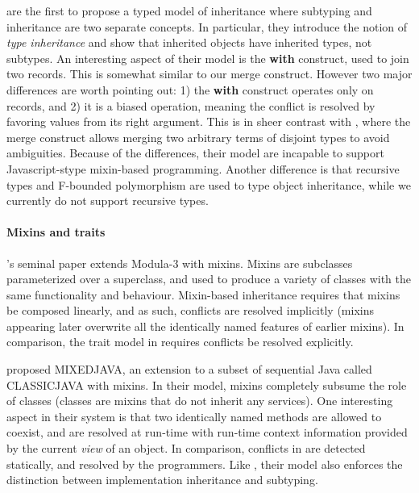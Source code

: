 \citet{cook1989inheritance} are the first to propose a typed model of
inheritance where subtyping and inheritance are two separate concepts. In
particular, they introduce the notion of \textit{type inheritance} and show that
inherited objects have inherited types, not subtypes. An interesting aspect of
their model is the \textbf{with} construct, used to join two records. This is
somewhat similar to our merge construct. However two major differences are worth
pointing out: 1) the \textbf{with} construct operates only on records, and 2) it
is a biased operation, meaning the conflict is resolved by favoring values from
its right argument. This is in sheer contrast with \name, where the merge
construct allows merging two arbitrary terms of disjoint types to avoid
ambiguities. Because of the differences, their model are incapable to support
Javascript-stype mixin-based programming. Another difference is that recursive
types and F-bounded polymorphism are used to type object inheritance, while we
currently do not support recursive types.

\paragraph{Mixins and traits} \citet{bracha1990mixin}'s seminal paper extends
Modula-3 with mixins. Mixins are subclasses parameterized over a superclass, and
used to produce a variety of classes with the same functionality and behaviour.
Mixin-based inheritance requires that mixins be composed linearly, and as such,
conflicts are resolved implicitly (mixins appearing later overwrite all the
identically named features of earlier mixins). In comparison, the trait model in
\name requires conflicts be resolved explicitly.

\citet{flatt1998classes} proposed MIXEDJAVA, an extension to a subset of
sequential Java called CLASSICJAVA with mixins. In their model, mixins
completely subsume the role of classes (classes are mixins that do not inherit
any services). One interesting aspect in their system is that two identically
named methods are allowed to coexist, and are resolved at run-time with run-time
context information provided by the current \textit{view} of an object. In
comparison, conflicts in \name are detected statically, and resolved by the
programmers. Like \name, their model also enforces the distinction between
implementation inheritance and subtyping.



